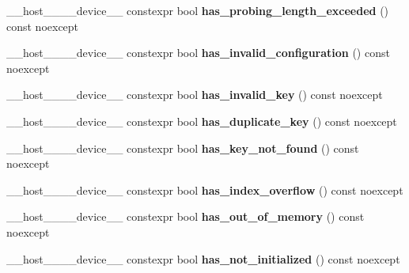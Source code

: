 \begin{DoxyCompactItemize}
\+\_\+\+\_\+host\+\_\+\+\_\+\+\_\+\+\_\+device\+\_\+\+\_\+ constexpr bool {\bfseries has\+\_\+probing\+\_\+length\+\_\+exceeded} () const noexcept
\item 
\mbox{\label{classwarpcore_1_1Status_a2e898bf185d65a1be3ed10e43b1d15eb}} 
\+\_\+\+\_\+host\+\_\+\+\_\+\+\_\+\+\_\+device\+\_\+\+\_\+ constexpr bool {\bfseries has\+\_\+invalid\+\_\+configuration} () const noexcept
\item 
\mbox{\label{classwarpcore_1_1Status_aec4300eb32bc3cad4a6e6a97c311dfcf}} 
\+\_\+\+\_\+host\+\_\+\+\_\+\+\_\+\+\_\+device\+\_\+\+\_\+ constexpr bool {\bfseries has\+\_\+invalid\+\_\+key} () const noexcept
\item 
\mbox{\label{classwarpcore_1_1Status_ae2d878f3cf60c3250d783be8bc31f69f}} 
\+\_\+\+\_\+host\+\_\+\+\_\+\+\_\+\+\_\+device\+\_\+\+\_\+ constexpr bool {\bfseries has\+\_\+duplicate\+\_\+key} () const noexcept
\item 
\mbox{\label{classwarpcore_1_1Status_a6dcfcc7d2c6fddb694aa0358ad65cd1b}} 
\+\_\+\+\_\+host\+\_\+\+\_\+\+\_\+\+\_\+device\+\_\+\+\_\+ constexpr bool {\bfseries has\+\_\+key\+\_\+not\+\_\+found} () const noexcept
\item 
\mbox{\label{classwarpcore_1_1Status_aa32c7617ab25e76385f727b43a819757}} 
\+\_\+\+\_\+host\+\_\+\+\_\+\+\_\+\+\_\+device\+\_\+\+\_\+ constexpr bool {\bfseries has\+\_\+index\+\_\+overflow} () const noexcept
\item 
\mbox{\label{classwarpcore_1_1Status_ab055be1303858f29c41142a33a817cef}} 
\+\_\+\+\_\+host\+\_\+\+\_\+\+\_\+\+\_\+device\+\_\+\+\_\+ constexpr bool {\bfseries has\+\_\+out\+\_\+of\+\_\+memory} () const noexcept
\item 
\mbox{\label{classwarpcore_1_1Status_a3d0308deca5d97d37fadb665e9b05ad4}} 
\+\_\+\+\_\+host\+\_\+\+\_\+\+\_\+\+\_\+device\+\_\+\+\_\+ constexpr bool {\bfseries has\+\_\+not\+\_\+initialized} () const noexcept
\item 
\mbox{\label{classwarpcore_1_1Status_a8edc01c22ee98087660028978ad0f1cd}} 

\end{DoxyCompactItemize}
